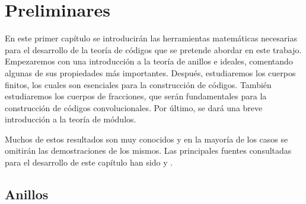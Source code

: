 

\chapter{Preliminares}\label{ch:primer-capitulo}

En este primer capítulo se introducirán las herramientas matemáticas necesarias para el desarrollo de la teoría de códigos que se pretende abordar en este trabajo. Empezaremos con una introducción a la teoría de anillos e ideales, comentando algunas de sus propiedades más importantes. Después, estudiaremos los cuerpos finitos, los cuales son esenciales para la construcción de códigos. También estudiaremos los cuerpos de fracciones, que serán fundamentales para la construcción de códigos convolucionales. Por último, se dará una breve introducción a la teoría de módulos.   

Muchos de estos resultados son muy conocidos y en la mayoría de los casos se omitirán las demostraciones de los mismos. Las principales fuentes consultadas para el desarrollo de este capítulo han sido \cite{knapp2006basic}y \cite{Huffman_Pless_2010}.

\section{Anillos}

